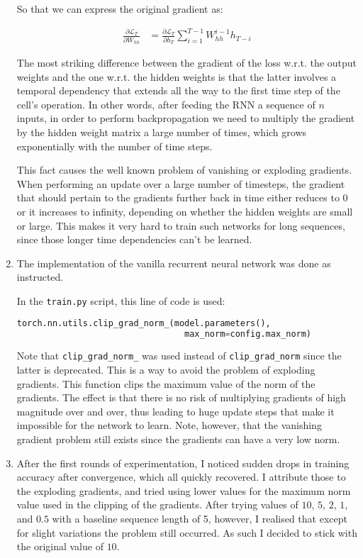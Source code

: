 \documentclass{article}
\newcommand{\del}[2]{\ensuremath{\frac{\partial #1}{\partial #2}}}
\newcommand{\Ell}{\ensuremath{\mathcal{L}}}
\begin{document}
\begin{enumerate}[label=\textbf{1.\arabic*}]
  So that we can express the original gradient as:

  \begin{align*}
    \del{\Ell_T}{W_{hh}} &= \del{\Ell_T}{h_T} \sum_{i=1}^{T-1} W_{hh}^{i-1} h_{T-i}
  \end{align*}

  The most striking difference between the gradient of the loss w.r.t. the output weights and the one w.r.t. the hidden weights is that the latter involves a temporal dependency that extends all the way to the first time step of the cell's operation. In other words, after feeding the RNN a sequence of $n$ inputs, in order to perform backpropagation we need to multiply the gradient by the hidden weight matrix a large number of times, which grows exponentially with the number of time steps.

  This fact causes the well known problem of vanishing or exploding gradients. When performing an update over a large number of timesteps, the gradient that should pertain to the gradients further back in time either reduces to $0$ or it increases to infinity, depending on whether the hidden weights are small or large. This makes it very hard to train such networks for long sequences, since those longer time dependencies can't be learned.

  \item
  The implementation of the vanilla recurrent neural network was done as instructed.

  In the \texttt{train.py} script, this line of code is used:
  \begin{lstlisting}[language=Python]
  torch.nn.utils.clip_grad_norm_(model.parameters(),
                                 max_norm=config.max_norm)
  \end{lstlisting}
  Note that \texttt{clip\_grad\_norm\_} was used instead of \texttt{clip\_grad\_norm} since the latter is deprecated. This is a way to avoid the problem of exploding gradients. This function clips the maximum value of the norm of the gradients. The effect is that there is no risk of multiplying gradients of high magnitude over and over, thus leading to huge update steps that make it impossible for the network to learn. Note, however, that the vanishing gradient problem still exists since the gradients can have a very low norm.

  \item
  After the first rounds of experimentation, I noticed sudden drops in training accuracy after convergence, which all quickly recovered. I attribute those to the exploding gradients, and tried using lower values for the maximum norm value used in the clipping of the gradients. After trying values of $10$, $5$, $2$, $1$, and $0.5$ with a baseline sequence length of 5, however, I realised that except for slight variations the problem still occurred. As such I decided to stick with the original value of $10$.


\end{enumerate}
\end{document}
